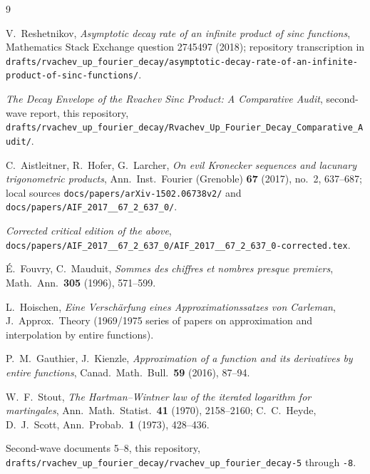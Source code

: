 \documentclass[11pt,oneside]{article}
\theoremstyle{definition}
\theoremstyle{remark}
\begin{document}
\begin{thebibliography}{9}

V.~Reshetnikov, \emph{Asymptotic decay rate of an infinite product of
sinc functions}, Mathematics Stack Exchange question 2745497 (2018);
repository transcription in
\nolinkurl{drafts/rvachev_up_fourier_decay/asymptotic-decay-rate-of-an-infinite-product-of-sinc-functions/}.

\emph{The Decay Envelope of the Rvachev Sinc Product: A Comparative
Audit}, second-wave report, this repository,
\nolinkurl{drafts/rvachev_up_fourier_decay/Rvachev_Up_Fourier_Decay_Comparative_Audit/}.

C.~Aistleitner, R.~Hofer, G.~Larcher, \emph{On evil Kronecker sequences
and lacunary trigonometric products}, Ann.\ Inst.\ Fourier (Grenoble)
\textbf{67} (2017), no.~2, 637--687; local sources
\nolinkurl{docs/papers/arXiv-1502.06738v2/} and
\nolinkurl{docs/papers/AIF_2017__67_2_637_0/}.

\emph{Corrected critical edition of the above},
\nolinkurl{docs/papers/AIF_2017__67_2_637_0/AIF_2017__67_2_637_0-corrected.tex}.

\'E.~Fouvry, C.~Mauduit, \emph{Sommes des chiffres et nombres presque
premiers}, Math.\ Ann.\ \textbf{305} (1996), 571--599.

L.~Hoischen, \emph{Eine Versch\"arfung eines Approximationssatzes von
Carleman}, J.\ Approx.\ Theory (1969/1975 series of papers on
approximation and interpolation by entire functions).

P.~M.~Gauthier, J.~Kienzle, \emph{Approximation of a function and its
derivatives by entire functions}, Canad.\ Math.\ Bull.\ \textbf{59}
(2016), 87--94.

W.~F.~Stout, \emph{The Hartman--Wintner law of the iterated logarithm
for martingales}, Ann.\ Math.\ Statist.\ \textbf{41} (1970),
2158--2160; C.~C.~Heyde, D.~J.~Scott, Ann.\ Probab.\ \textbf{1} (1973),
428--436.

Second-wave documents 5--8, this repository,
\nolinkurl{drafts/rvachev_up_fourier_decay/rvachev_up_fourier_decay-5} through
\nolinkurl{-8}.

\end{thebibliography}
\end{document}
